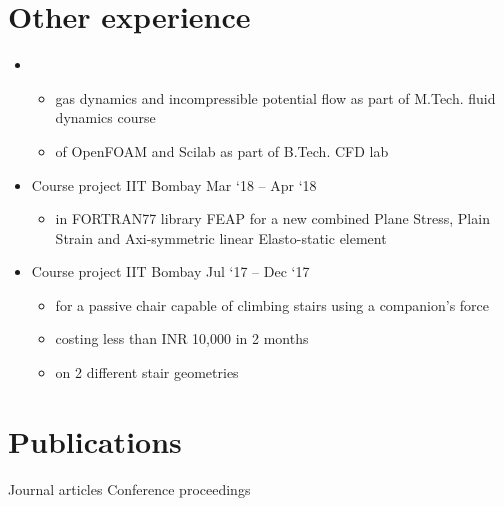 \documentclass[a4paper,10pt]{article}
\newcommand{\of}{OpenFOAM}
\newcommand{\feap}{FEAP}
\begin{document}
\section{Other experience}
\begin{itemize}
	\item {}
	\begin{itemize}
		\item {} gas dynamics and incompressible potential flow as part of M.Tech. fluid dynamics course
		\item {} of \of{} and Scilab as part of B.Tech. CFD lab
	\end{itemize}
	\item {}
	{Course project}
	{IIT Bombay}
	{Mar `18 -- Apr `18}
	\begin{itemize}
		\item {} in FORTRAN77 library \feap{} for a new combined Plane Stress, Plain Strain and Axi-symmetric linear Elasto-static element
	\end{itemize}
	\item {}
	{Course project}
	{IIT Bombay}
	{Jul `17 -- Dec `17}
	\begin{itemize}
		\item {} for a passive chair capable of climbing stairs using a companion's force
		\item {} costing less than INR 10,000 in 2 months
		\item {} on 2 different stair geometries
	\end{itemize}
\end{itemize}



\section{Publications}
\nocite{*}
Journal articles
\printbibliography[heading=none, type=article, resetnumbers=true]%
\noindent Conference proceedings
\printbibliography[heading=none, type=inproceedings, resetnumbers=true]
\end{document}

